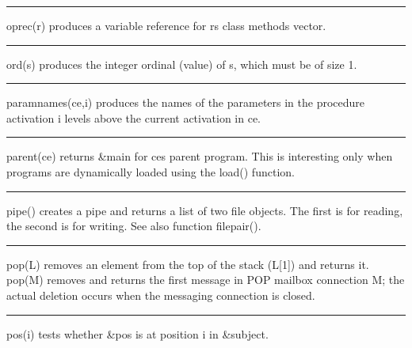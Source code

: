 \bigskip\hrule\vspace{0.1cm}

\noindent
\textsf{oprec(r)} produces a variable reference for
\textsf{r}{\textquotesingle}s class{\textquotesingle} methods vector.

\bigskip\hrule\vspace{0.1cm}

\noindent
{}\textsf{ord(s)} produces the integer ordinal
(value) of \textsf{s}, which must be of size 1.

\bigskip\hrule\vspace{0.1cm}

\noindent
{}\textsf{paramnames(ce,i)} produces the names of
the parameters in the procedure activation \textsf{i} levels above the
current activation in \textsf{ce}.

\bigskip\hrule\vspace{0.1cm}

\noindent
\textsf{parent(ce)} returns \textsf{\&main} for ce{\textquotesingle}s
parent program. This is interesting only when programs are dynamically
loaded using the \textsf{load()} function.

\bigskip\hrule\vspace{0.1cm}

\noindent
{}\textsf{pipe()} creates a pipe and returns a list of two
file objects. The first is for reading, the second is for writing. See
also function \textsf{filepair()}.

\bigskip\hrule\vspace{0.1cm}

\noindent
{}\textsf{pop(L)} removes an element from the top of the
stack (\textsf{L[1]}) and returns it. \textsf{pop(M)}
removes and returns the first message in POP mailbox connection M; the
actual deletion occurs when the messaging connection is closed.

\bigskip\hrule\vspace{0.1cm}

\noindent
{}\textsf{pos(i)} tests whether \textsf{\&pos} is at
position \textsf{i} in \textsf{\&subject}.

